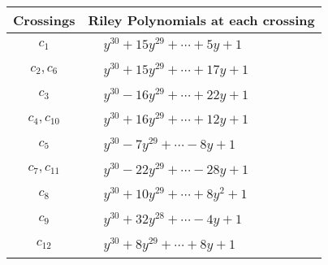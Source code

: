 \documentclass[1p]{elsarticle_modified}
\theoremstyle{definition}
\begin{document}
\begin{tabular}{m{50pt}|m{274pt}}
Crossings & \hspace{64pt}Riley Polynomials at each crossing \\
\hline $$\begin{aligned}c_{1}\end{aligned}$$&$\begin{aligned}
&y^{30}+15 y^{29}+\cdots+5 y+1
\end{aligned}$\\
\hline $$\begin{aligned}c_{2},c_{6}\end{aligned}$$&$\begin{aligned}
&y^{30}+15 y^{29}+\cdots+17 y+1
\end{aligned}$\\
\hline $$\begin{aligned}c_{3}\end{aligned}$$&$\begin{aligned}
&y^{30}-16 y^{29}+\cdots+22 y+1
\end{aligned}$\\
\hline $$\begin{aligned}c_{4},c_{10}\end{aligned}$$&$\begin{aligned}
&y^{30}+16 y^{29}+\cdots+12 y+1
\end{aligned}$\\
\hline $$\begin{aligned}c_{5}\end{aligned}$$&$\begin{aligned}
&y^{30}-7 y^{29}+\cdots-8 y+1
\end{aligned}$\\
\hline $$\begin{aligned}c_{7},c_{11}\end{aligned}$$&$\begin{aligned}
&y^{30}-22 y^{29}+\cdots-28 y+1
\end{aligned}$\\
\hline $$\begin{aligned}c_{8}\end{aligned}$$&$\begin{aligned}
&y^{30}+10 y^{29}+\cdots+8 y^2+1
\end{aligned}$\\
\hline $$\begin{aligned}c_{9}\end{aligned}$$&$\begin{aligned}
&y^{30}+32 y^{28}+\cdots-4 y+1
\end{aligned}$\\
\hline $$\begin{aligned}c_{12}\end{aligned}$$&$\begin{aligned}
&y^{30}+8 y^{29}+\cdots+8 y+1
\end{aligned}$\\
\hline
\end{tabular}\\~\\
\end{document}
